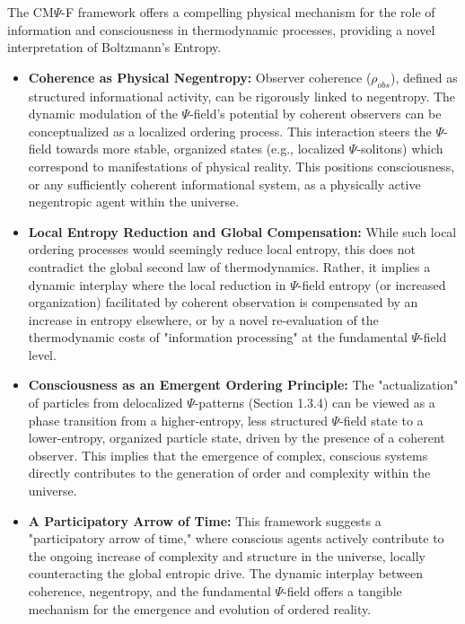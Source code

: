 \documentclass{report}
\begin{document}
The CM$\Psi$-F framework offers a compelling physical mechanism for the role of information and consciousness in thermodynamic processes, providing a novel interpretation of Boltzmann's Entropy.

\begin{itemize}
    \item \textbf{Coherence as Physical Negentropy:} Observer coherence ($\rho_{obs}$), defined as structured informational activity, can be rigorously linked to negentropy. The dynamic modulation of the $\Psi$-field's potential by coherent observers can be conceptualized as a localized ordering process. This interaction steers the $\Psi$-field towards more stable, organized states (e.g., localized $\Psi$-solitons) which correspond to manifestations of physical reality. This positions consciousness, or any sufficiently coherent informational system, as a physically active negentropic agent within the universe.
    \item \textbf{Local Entropy Reduction and Global Compensation:} While such local ordering processes would seemingly reduce local entropy, this does not contradict the global second law of thermodynamics. Rather, it implies a dynamic interplay where the local reduction in $\Psi$-field entropy (or increased organization) facilitated by coherent observation is compensated by an increase in entropy elsewhere, or by a novel re-evaluation of the thermodynamic costs of "information processing" at the fundamental $\Psi$-field level.
    \item \textbf{Consciousness as an Emergent Ordering Principle:} The "actualization" of particles from delocalized $\Psi$-patterns (Section 1.3.4) can be viewed as a phase transition from a higher-entropy, less structured $\Psi$-field state to a lower-entropy, organized particle state, driven by the presence of a coherent observer. This implies that the emergence of complex, conscious systems directly contributes to the generation of order and complexity within the universe.
    \item \textbf{A Participatory Arrow of Time:} This framework suggests a "participatory arrow of time," where conscious agents actively contribute to the ongoing increase of complexity and structure in the universe, locally counteracting the global entropic drive. The dynamic interplay between coherence, negentropy, and the fundamental $\Psi$-field offers a tangible mechanism for the emergence and evolution of ordered reality.
\end{itemize}
\end{document}
